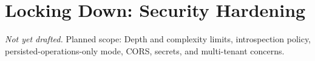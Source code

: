 \chapter{Locking Down: Security Hardening}
\label{ch:security-hardening}

\emph{Not yet drafted.} Planned scope: Depth and complexity limits, introspection policy, persisted-operations-only mode, CORS, secrets, and multi-tenant concerns.

% 
